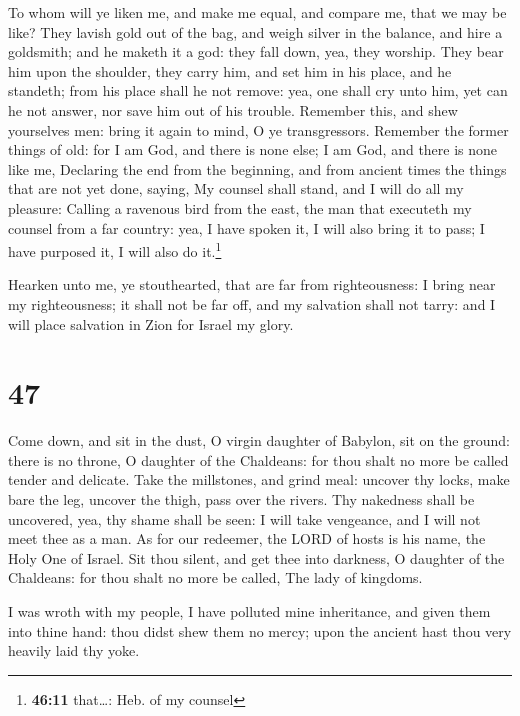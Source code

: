  To whom will ye liken me, and make me equal, and compare
me, that we may be like?  They lavish gold out of the bag,
and weigh silver in the balance, and hire a goldsmith; and he maketh it
a god: they fall down, yea, they worship.  They bear him
upon the shoulder, they carry him, and set him in his place, and he
standeth; from his place shall he not remove: yea, one shall cry unto
him, yet can he not answer, nor save him out of his trouble.
 Remember this, and shew yourselves men: bring it again to
mind, O ye transgressors.  Remember the former things of
old: for I am God, and there is none else; I am God, and there is none
like me,  Declaring the end from the beginning, and from
ancient times the things that are not yet done, saying, My counsel shall
stand, and I will do all my pleasure:  Calling a ravenous
bird from the east, the man that executeth my counsel from a far
country: yea, I have spoken it, I will also bring it to pass; I have
purposed it, I will also do it.\footnote{\textbf{46:11} that\ldots: Heb.
  of my counsel}

 Hearken unto me, ye stouthearted, that are far from
righteousness:  I bring near my righteousness; it shall
not be far off, and my salvation shall not tarry: and I will place
salvation in Zion for Israel my glory.

\hypertarget{section-46}{%
\section{47}\label{section-46}}

 Come down, and sit in the dust, O virgin daughter of
Babylon, sit on the ground: there is no throne, O daughter of the
Chaldeans: for thou shalt no more be called tender and delicate.
 Take the millstones, and grind meal: uncover thy locks,
make bare the leg, uncover the thigh, pass over the rivers.
 Thy nakedness shall be uncovered, yea, thy shame shall be
seen: I will take vengeance, and I will not meet thee as a man.
 As for our redeemer, the LORD of hosts is his name, the
Holy One of Israel.  Sit thou silent, and get thee into
darkness, O daughter of the Chaldeans: for thou shalt no more be called,
The lady of kingdoms.

 I was wroth with my people, I have polluted mine
inheritance, and given them into thine hand: thou didst shew them no
mercy; upon the ancient hast thou very heavily laid thy yoke.

